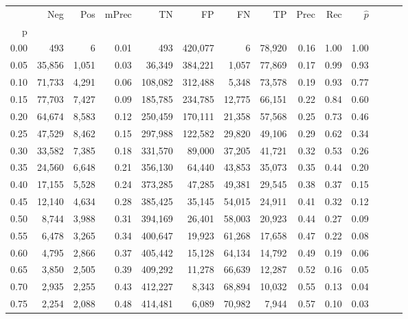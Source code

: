 \begin{tabular}{rrrrrrrrrrrrrr}
\toprule
{} &     Neg &    Pos & mPrec &       TN &       FP &      FN &      TP &  Prec &   Rec & $\hat{p}$ \\
p    &         &        &       &          &          &         &         &       &       &           \\
\midrule
0.00 &     493 &      6 &  0.01 &      493 &  420,077 &       6 &  78,920 &  0.16 &  1.00 &      1.00 \\
0.05 &  35,856 &  1,051 &  0.03 &   36,349 &  384,221 &   1,057 &  77,869 &  0.17 &  0.99 &      0.93 \\
0.10 &  71,733 &  4,291 &  0.06 &  108,082 &  312,488 &   5,348 &  73,578 &  0.19 &  0.93 &      0.77 \\
0.15 &  77,703 &  7,427 &  0.09 &  185,785 &  234,785 &  12,775 &  66,151 &  0.22 &  0.84 &      0.60 \\
0.20 &  64,674 &  8,583 &  0.12 &  250,459 &  170,111 &  21,358 &  57,568 &  0.25 &  0.73 &      0.46 \\
0.25 &  47,529 &  8,462 &  0.15 &  297,988 &  122,582 &  29,820 &  49,106 &  0.29 &  0.62 &      0.34 \\
0.30 &  33,582 &  7,385 &  0.18 &  331,570 &   89,000 &  37,205 &  41,721 &  0.32 &  0.53 &      0.26 \\
0.35 &  24,560 &  6,648 &  0.21 &  356,130 &   64,440 &  43,853 &  35,073 &  0.35 &  0.44 &      0.20 \\
0.40 &  17,155 &  5,528 &  0.24 &  373,285 &   47,285 &  49,381 &  29,545 &  0.38 &  0.37 &      0.15 \\
0.45 &  12,140 &  4,634 &  0.28 &  385,425 &   35,145 &  54,015 &  24,911 &  0.41 &  0.32 &      0.12 \\
0.50 &   8,744 &  3,988 &  0.31 &  394,169 &   26,401 &  58,003 &  20,923 &  0.44 &  0.27 &      0.09 \\
0.55 &   6,478 &  3,265 &  0.34 &  400,647 &   19,923 &  61,268 &  17,658 &  0.47 &  0.22 &      0.08 \\
0.60 &   4,795 &  2,866 &  0.37 &  405,442 &   15,128 &  64,134 &  14,792 &  0.49 &  0.19 &      0.06 \\
0.65 &   3,850 &  2,505 &  0.39 &  409,292 &   11,278 &  66,639 &  12,287 &  0.52 &  0.16 &      0.05 \\
0.70 &   2,935 &  2,255 &  0.43 &  412,227 &    8,343 &  68,894 &  10,032 &  0.55 &  0.13 &      0.04 \\
0.75 &   2,254 &  2,088 &  0.48 &  414,481 &    6,089 &  70,982 &   7,944 &  0.57 &  0.10 &      0.03 \\

\end{tabular}
